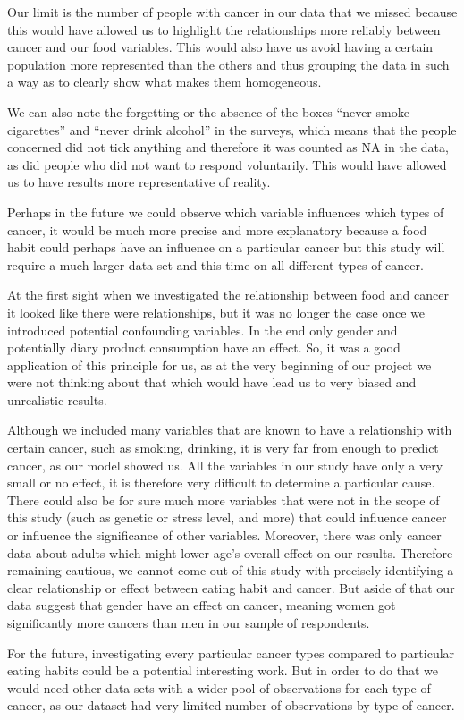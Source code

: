 \documentclass[
]{article}
\begin{document}
Our limit is the number of people with cancer in our data that we missed
because this would have allowed us to highlight the relationships more
reliably between cancer and our food variables. This would also have us
avoid having a certain population more represented than the others and
thus grouping the data in such a way as to clearly show what makes them
homogeneous.

We can also note the forgetting or the absence of the boxes ``never
smoke cigarettes'' and ``never drink alcohol'' in the surveys, which
means that the people concerned did not tick anything and therefore it
was counted as NA in the data, as did people who did not want to respond
voluntarily. This would have allowed us to have results more
representative of reality.

Perhaps in the future we could observe which variable influences which
types of cancer, it would be much more precise and more explanatory
because a food habit could perhaps have an influence on a particular
cancer but this study will require a much larger data set and this time
on all different types of cancer.

At the first sight when we investigated the relationship between food
and cancer it looked like there were relationships, but it was no longer
the case once we introduced potential confounding variables. In the end
only gender and potentially diary product consumption have an effect.
So, it was a good application of this principle for us, as at the very
beginning of our project we were not thinking about that which would
have lead us to very biased and unrealistic results.

Although we included many variables that are known to have a
relationship with certain cancer, such as smoking, drinking, it is very
far from enough to predict cancer, as our model showed us. All the
variables in our study have only a very small or no effect, it is
therefore very difficult to determine a particular cause. There could
also be for sure much more variables that were not in the scope of this
study (such as genetic or stress level, and more) that could influence
cancer or influence the significance of other variables. Moreover, there
was only cancer data about adults which might lower age's overall effect
on our results. Therefore remaining cautious, we cannot come out of this
study with precisely identifying a clear relationship or effect between
eating habit and cancer. But aside of that our data suggest that gender
have an effect on cancer, meaning women got significantly more cancers
than men in our sample of respondents.

For the future, investigating every particular cancer types compared to
particular eating habits could be a potential interesting work. But in
order to do that we would need other data sets with a wider pool of
observations for each type of cancer, as our dataset had very limited
number of observations by type of cancer.
\end{document}
